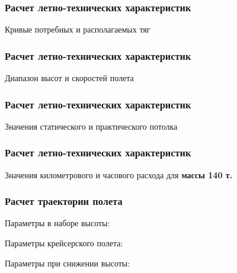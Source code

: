 \documentclass{beamer}
\begin{document}
\begin{frame}
    \frametitle{Расчет летно-технических характеристик}
    \begin{center}
    Кривые потребных и располагаемых тяг
    \resizebox{0.70\textwidth}{!}{
    {}
    }
    \end{center}
\end{frame}

\begin{frame}
    \frametitle{Расчет летно-технических характеристик}
    \begin{center}
   Диапазон высот и скоростей полета 
\resizebox{0.70\textwidth}{!}{
{}
}
\end{center}
\end{frame}

\begin{frame}[t]
    \frametitle{Расчет летно-технических характеристик}
    \begin{center}
        Значения статического и практического потолка
        \resizebox{.70\linewidth}{!}{}
    \end{center}
\end{frame}
\begin{frame}[t]
    \frametitle{Расчет летно-технических характеристик}
    \begin{center}
        Значения километрового и часового расхода для \textbf{массы 140 т.}
        \resizebox{.70\linewidth}{!}{}
    \end{center}
\end{frame}
\begin{frame}[t]
    \frametitle{Расчет траектории полета}

    \begin{center}
        Параметры в наборе высоты:

        
        \vfill

        Параметры крейсерского полета:

        
        \vfill
        Параметры  при снижении высоты:

        
    \end{center}
\end{frame}
\end{document}
